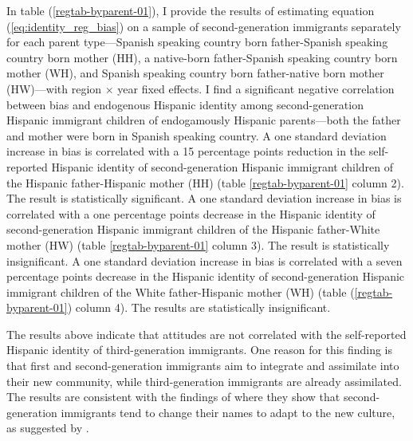 \documentclass[12pt, fullpage]{article}
\begin{document}
In table (\ref{regtab-byparent-01}), I provide the results of estimating equation (\ref{eq:identity_reg_bias}) on a sample of second-generation immigrants separately for each parent type---Spanish speaking country born father-Spanish speaking country born mother (HH), a native-born father-Spanish speaking country born mother (WH), and Spanish speaking country born father-native born mother (HW)---with region $\times$ year fixed effects. I find a significant negative correlation between bias and endogenous Hispanic identity among second-generation Hispanic immigrant children of endogamously Hispanic parents---both the father and mother were born in Spanish speaking country. A one standard deviation increase in bias is correlated with a 15 percentage points reduction in the self-reported Hispanic identity of second-generation Hispanic immigrant children of the Hispanic father-Hispanic mother (HH) (table \ref{regtab-byparent-01} column 2). The result is statistically significant. A one standard deviation increase in bias is correlated with a one percentage points decrease in the Hispanic identity of second-generation Hispanic immigrant children of the Hispanic father-White mother (HW) (table \ref{regtab-byparent-01} column 3). The result is statistically insignificant. A one standard deviation increase in bias is correlated with a seven percentage points decrease in the Hispanic identity of second-generation Hispanic immigrant children of the White father-Hispanic mother (WH) (table (\ref{regtab-byparent-01}) column 4). The results are statistically insignificant.

The results above indicate that attitudes are not correlated with the self-reported Hispanic identity of third-generation immigrants. One reason for this finding is that first and second-generation immigrants aim to integrate and assimilate into their new community, while third-generation immigrants are already assimilated. The results are consistent with the findings of \citet{abramitzkyImmigrantsAssimilateMore2020a} where they show that second-generation immigrants tend to change their names to adapt to the new culture, as suggested by \citet{abramitzkyImmigrantsAssimilateMore2020a}. 
\end{document}

